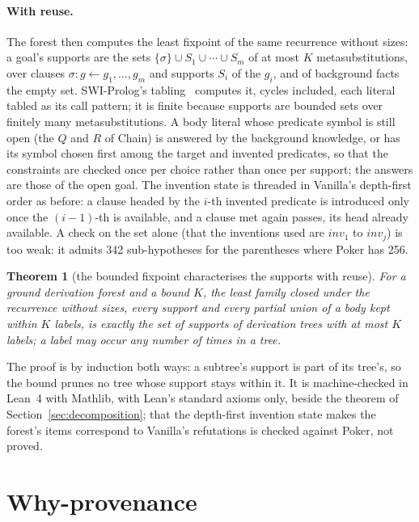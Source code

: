 \documentclass[11pt]{article}
\newtheorem{theorem}{Theorem}
\begin{document}
\paragraph{With reuse.} The forest then computes the least fixpoint of the same
recurrence without sizes: a goal's supports are the sets $\{\sigma\} \cup S_1 \cup
\cdots \cup S_m$ of at most $K$ metasubstitutions, over clauses
$\sigma : g \leftarrow g_1, \ldots, g_m$ and supports $S_i$ of the $g_i$, and of
background facts the empty set. SWI-Prolog's tabling~\cite{swipl} computes it,
cycles included, each literal tabled as its call pattern; it is finite because
supports are bounded sets over finitely many metasubstitutions. A body literal
whose predicate symbol is still open (the $Q$ and $R$ of Chain) is answered by the
background knowledge, or has its symbol chosen first among the target and invented
predicates, so that the constraints are checked once per choice rather than once per
support; the answers are those of the open goal. The invention state is threaded in Vanilla's depth-first order
as before: a clause headed by the $i$-th invented predicate is introduced only once
the $(i{-}1)$-th is available, and a clause met again passes, its head already
available. A check on the set alone (that the inventions used are $inv_1$ to $inv_j$)
is too weak: it admits 342 sub-hypotheses for the parentheses where Poker has 256.

\begin{theorem}[the bounded fixpoint characterises the supports with reuse]
For a ground derivation forest and a bound $K$, the least family closed under the
recurrence without sizes, every support and every partial union of a body kept
within $K$ labels, is exactly the set of supports of derivation trees with at most
$K$ labels; a label may occur any number of times in a tree.
\end{theorem}

The proof is by induction both ways: a subtree's support is part of its tree's, so
the bound prunes no tree whose support stays within it. It is machine-checked in
Lean~4 with Mathlib, with Lean's standard axioms only, beside the theorem of
Section~\ref{sec:decomposition}; that the depth-first invention state makes the forest's
items correspond to Vanilla's refutations is checked against Poker, not proved.

\section{Why-provenance}
\end{document}
